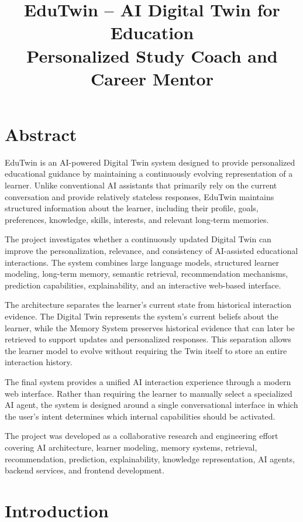 \documentclass[12pt,a4paper]{article}
\title{\textbf{\LARGE EduTwin – AI Digital Twin for Education}\\[0.4em]
\large Personalized Study Coach and Career Mentor}
\author{}
\date{}
\begin{document}
\maketitle

\section*{Abstract}
EduTwin is an AI-powered Digital Twin system designed to provide personalized educational guidance by maintaining a continuously evolving representation of a learner. Unlike conventional AI assistants that primarily rely on the current conversation and provide relatively stateless responses, EduTwin maintains structured information about the learner, including their profile, goals, preferences, knowledge, skills, interests, and relevant long-term memories.

The project investigates whether a continuously updated Digital Twin can improve the personalization, relevance, and consistency of AI-assisted educational interactions. The system combines large language models, structured learner modeling, long-term memory, semantic retrieval, recommendation mechanisms, prediction capabilities, explainability, and an interactive web-based interface.

The architecture separates the learner's current state from historical interaction evidence. The Digital Twin represents the system's current beliefs about the learner, while the Memory System preserves historical evidence that can later be retrieved to support updates and personalized responses. This separation allows the learner model to evolve without requiring the Twin itself to store an entire interaction history.

The final system provides a unified AI interaction experience through a modern web interface. Rather than requiring the learner to manually select a specialized AI agent, the system is designed around a single conversational interface in which the user's intent determines which internal capabilities should be activated.

The project was developed as a collaborative research and engineering effort covering AI architecture, learner modeling, memory systems, retrieval, recommendation, prediction, explainability, knowledge representation, AI agents, backend services, and frontend development.

\newpage

\section{Introduction}
\end{document}
